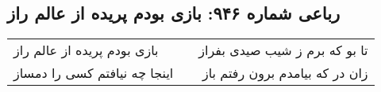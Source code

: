 \begin{center}
\section*{رباعی شماره ۹۴۶: بازی بودم پریده از عالم راز}
\label{sec:0946}
\begin{longtable}{l p{0.5cm} r}
بازی بودم پریده از عالم راز
&&
تا بو که برم ز شیب صیدی بفراز
\\
اینجا چه نیافتم کسی را دمساز
&&
زان در که بیامدم برون رفتم باز
\\
\end{longtable}
\end{center}
